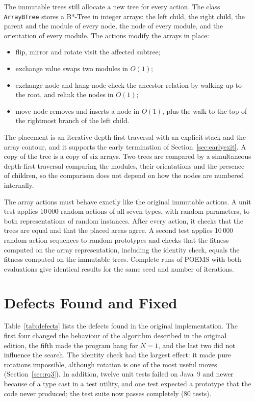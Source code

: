The immutable trees still allocate a new tree for every action. The class {\tt ArrayBTree} stores a B*-Tree in integer arrays: the left child, the right child, the parent and the module of every node, the node of every module, and the orientation of every module. The actions modify the arrays in place:
\begin{itemize}
\item flip, mirror and rotate visit the affected subtree;
\item exchange value swaps two modules in $O(1)$;
\item exchange node and hang node check the ancestor relation by walking up to the root, and relink the nodes in $O(1)$;
\item move node removes and inserts a node in $O(1)$, plus the walk to the top of the rightmost branch of the left child.
\end{itemize}
The placement is an iterative depth-first traversal with an explicit stack and the array contour, and it supports the early termination of Section~\ref{sec:earlyexit}. A copy of the tree is a copy of six arrays. Two trees are compared by a simultaneous depth-first traversal comparing the modules, their orientations and the presence of children, so the comparison does not depend on how the nodes are numbered internally.

The array actions must behave exactly like the original immutable actions. A unit test applies 10\,000 random actions of all seven types, with random parameters, to both representations of random instances. After every action, it checks that the trees are equal and that the placed areas agree. A second test applies 10\,000 random action sequences to random prototypes and checks that the fitness computed on the array representation, including the identity check, equals the fitness computed on the immutable trees. Complete runs of POEMS with both evaluations give identical results for the same seed and number of iterations.

\section{Defects Found and Fixed}
\label{sec:defects}

Table~\ref{tab:defects} lists the defects found in the original implementation. The first four changed the behaviour of the algorithm described in the original edition, the fifth made the program hang for $N = 1$, and the last two did not influence the search. The identity check had the largest effect: it made pure rotations impossible, although rotation is one of the most useful moves (Section~\ref{sec:rq3}). In addition, twelve unit tests failed on Java~9 and newer because of a type cast in a test utility, and one test expected a prototype that the code never produced; the test suite now passes completely (80 tests).

